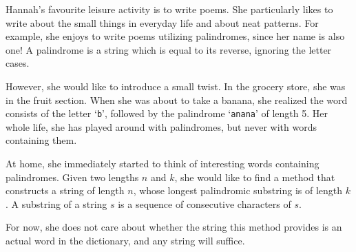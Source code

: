 





Hannah's favourite leisure activity is to write poems. She particularly likes
to write about the small things in everyday life and about neat patterns. For
example, she enjoys to write poems utilizing palindromes, since her name is also
one! A palindrome is a string which is equal to its reverse, ignoring the letter
cases.

However, she would like to introduce a small twist. In the grocery store, she
was in the fruit section. When she was about to take a banana, she realized the
word consists of the letter `\texttt{b}', followed by the palindrome
`\texttt{anana}' of length 5. Her whole life, she has played around with
palindromes, but never with words containing them. 

At home, she immediately started to think of interesting words containing
palindromes. Given two lengths $n$ and $k$, she would like to find a method that
constructs a string of length $n$, whose longest palindromic substring is of
length $k$. A substring of a string $s$ is a sequence of consecutive characters
of $s$.

For now, she does not care about whether the string this method provides is an
actual word in the dictionary, and any string will suffice.

